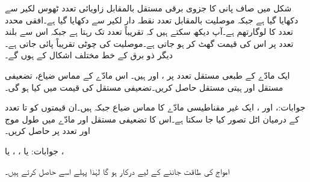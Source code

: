 شکل  میں صاف پانی کا جزوی برقی مستقل  بالمقابل زاویائی تعدد  ٹھوس لکیر سے دکھایا گیا ہے جبکہ موصلیت بالمقابل تعدد نقطہ دار لکیر سے دکھایا گیا ہے۔افقی محدد تعدد کا لوگارتھم  ہے۔آپ دیکھ سکتے ہیں کہ تقریباً  تعدد تک  رہتا ہے جبکہ اس سے بلند تعدد پر اس کی قیمت گھٹ کر  ہو جاتی ہے۔موصلیت کی چوٹی تقریباً  پائی جاتی ہے۔دیگر ذو برق کے خط مختلف اشکال کے ہوں گے۔

ایک مادّے  کے طبعی مستقل  تعدد پر  ،  اور  ہیں۔ اس مادّے کے مماس ضیاع، تضعیفی مستقل اور ہیتی مستقل حاصل کریں۔تضعیفی مستقل کی قیمت  میں کیا ہو گی۔

جوابات:،  اور ، 
ایک غیر مقناطیسی مادّے کا مماس ضیاع  جبکہ  ہیں۔ان قیمتوں کو  تا  تعدد کے درمیان اٹل تصور کیا جا سکتا ہے۔اس کا تضعیفی مستقل اور  مادّے میں طول موج   اور  تعدد پر حاصل کریں۔

جوابات: یا ، ،  یا ،  

امواج کی طاقت جاننے کے لیے    درکار ہو گا لہٰذا پہلے اسے حاصل کرتے ہیں۔

